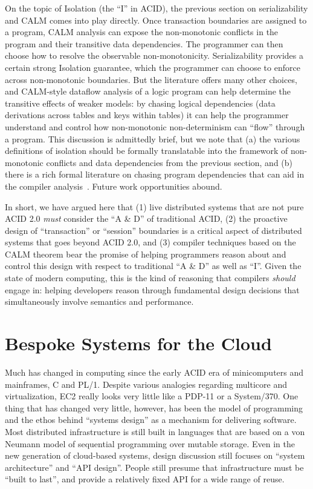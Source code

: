 \documentclass{sig-alternate}
\begin{document}
On the topic of Isolation (the ``I'' in ACID), the previous section on
serializability and CALM comes into play directly.  Once transaction boundaries
are assigned to a program, CALM analysis can expose the non-monotonic conflicts
in the program and their transitive data dependencies.  The programmer can then
choose how to resolve the observable non-monotonicity.  Serializability provides
a certain strong Isolation guarantee, which the programmer can choose to enforce
across non-monotonic boundaries.  But the literature offers many other choices,
and CALM-style dataflow analysis of a logic program can help determine the
transitive effects of weaker models: by chasing logical dependencies (data
derivations across tables and keys within tables) it can help the programmer
understand and control how non-monotonic non-determinism can ``flow'' through a
program.  This discussion is admittedly brief, but we note that (a) the various
definitions of isolation should be formally translatable into the framework of
non-monotonic conflicts and data dependencies from the previous section, and (b)
there is a rich formal literature on chasing program dependencies that can aid
in the compiler analysis~\cite{alicebook}.  Future work opportunities abound.

In short, we have argued here that (1) live distributed systems that are not pure ACID 2.0 \emph{must} consider the ``A \& D'' of traditional ACID, (2) the proactive design of ``transaction'' or ``session'' boundaries is a critical aspect of distributed systems that goes beyond ACID 2.0, and (3) compiler techniques based on the CALM theorem bear the promise of helping programmers reason about and control this design with respect to traditional ``A \& D'' as well as ``I''.  Given the state of modern computing, this is the kind of reasoning that compilers \emph{should} engage in: helping developers reason through fundamental design decisions that simultaneously involve semantics and performance.  

\section{Bespoke Systems for the Cloud}
Much has changed in computing since the early ACID era of minicomputers and mainframes, C and PL/1.  Despite various analogies regarding multicore and virtualization, EC2 really looks very little like a PDP-11 or a System/370.  One thing that has changed very little, however, has been the model of programming and the ethos behind ``systems design'' as a mechanism for delivering software.  Most distributed infrastructure is still built in languages that are based on a von Neumann model of sequential programming over mutable storage.  Even in the new generation of cloud-based systems, design discussion still focuses on ``system architecture'' and ``API design''.  People still presume that infrastructure must be ``built to last'', and provide a relatively fixed API for a wide range of reuse.  
\end{document}
